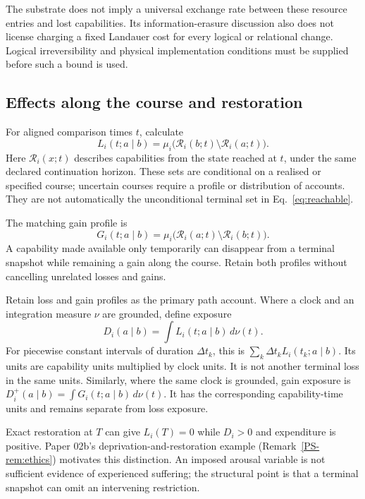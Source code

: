 \documentclass[11pt,a4paper]{article}
\theoremstyle{remark}
\newcommand{\R}{\mathcal R}
\begin{document}
The substrate does not imply a universal exchange rate between these resource
entries and lost capabilities. Its information-erasure discussion also does not
license charging a fixed Landauer cost for every logical or relational change.
Logical irreversibility and physical implementation conditions must be supplied
before such a bound is used.

\subsection{Effects along the course and restoration}

For aligned comparison times $t$, calculate
\begin{equation}\label{eq:path}
L_i(t;a\mid b)=\mu_i\bigl(\R_i(b;t)\setminus\R_i(a;t)\bigr).
\end{equation}
Here $\R_i(x;t)$ describes capabilities from the state reached at $t$, under the
same declared continuation horizon. These sets are conditional on a realised or
specified course; uncertain courses require a profile or distribution of
accounts. They are not automatically the unconditional terminal set in
Eq.~\eqref{eq:reachable}.

The matching gain profile is
\begin{equation}\label{eq:path-gain}
G_i(t;a\mid b)=\mu_i\bigl(\R_i(a;t)\setminus\R_i(b;t)\bigr).
\end{equation}
A capability made available only temporarily can disappear from a terminal
snapshot while remaining a gain along the course. Retain both profiles without
cancelling unrelated losses and gains.

Retain loss and gain profiles as the primary path account. Where a clock and an
integration measure $\nu$ are grounded, define exposure
\begin{equation}\label{eq:exposure}
D_i(a\mid b)=\int L_i(t;a\mid b)\,d\nu(t).
\end{equation}
For piecewise constant intervals of duration $\Delta t_k$, this is
$\sum_k\Delta t_k L_i(t_k;a\mid b)$. Its units are capability units multiplied
by clock units. It is not another terminal loss in the same units.
Similarly, where the same clock is grounded, gain exposure is
$D_i^+(a\mid b)=\int G_i(t;a\mid b)\,d\nu(t)$. It has the corresponding
capability-time units and remains separate from loss exposure.

Exact restoration at $T$ can give $L_i(T)=0$ while $D_i>0$ and expenditure is
positive. Paper 02b's deprivation-and-restoration example
(Remark~\ref{PS-rem:ethics}) motivates this distinction. An imposed arousal
variable is not sufficient evidence of experienced suffering; the structural
point is that a terminal snapshot can omit an intervening restriction.
\end{document}
